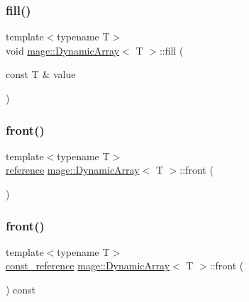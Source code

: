 \mbox{\label{classmage_1_1_dynamic_array_af8f2f59a13d32635a6196857fb6cc2a4}} 
\subsubsection{\texorpdfstring{fill()}{fill()}}
{\footnotesize\ttfamily template$<$typename T$>$ \\
void \mbox{\hyperlink{classmage_1_1_dynamic_array}{mage\+::\+Dynamic\+Array}}$<$ T $>$\+::fill (\begin{DoxyParamCaption}\item[{const T \&}]{value }\end{DoxyParamCaption})}

\mbox{\label{classmage_1_1_dynamic_array_a6d63e95126e5f95630d558425a73ed0c}} 
\subsubsection{\texorpdfstring{front()}{front()}\hspace{0.1cm}{\footnotesize\ttfamily [1/2]}}
{\footnotesize\ttfamily template$<$typename T$>$ \\
\mbox{\hyperlink{classmage_1_1_dynamic_array_ac725ab843a578b8eb2e4499eca728149}{reference}} \mbox{\hyperlink{classmage_1_1_dynamic_array}{mage\+::\+Dynamic\+Array}}$<$ T $>$\+::front (\begin{DoxyParamCaption}{ }\end{DoxyParamCaption})\hspace{0.3cm}{\ttfamily [noexcept]}}

\mbox{\label{classmage_1_1_dynamic_array_a5d0029b7258394447b55c2bb7f0d1181}} 
\subsubsection{\texorpdfstring{front()}{front()}\hspace{0.1cm}{\footnotesize\ttfamily [2/2]}}
{\footnotesize\ttfamily template$<$typename T$>$ \\
\mbox{\hyperlink{classmage_1_1_dynamic_array_ad2c044077223c0463e317649d4513dbc}{const\+\_\+reference}} \mbox{\hyperlink{classmage_1_1_dynamic_array}{mage\+::\+Dynamic\+Array}}$<$ T $>$\+::front (\begin{DoxyParamCaption}{ }\end{DoxyParamCaption}) const\hspace{0.3cm}{\ttfamily [noexcept]}}

